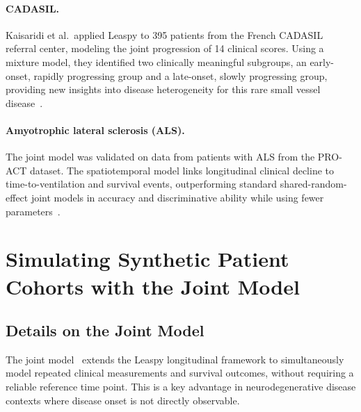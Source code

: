 \documentclass{rapportCS}
\begin{document}
\paragraph{CADASIL.}
Kaisaridi et al.\ applied Leaspy to 395 patients from the French CADASIL referral center, modeling the joint progression of 14 clinical scores. Using a mixture model, they identified two clinically meaningful subgroups, an early-onset, rapidly progressing group and a late-onset, slowly progressing group, providing new insights into disease heterogeneity for this rare small vessel disease~\cite{kaisaridi2025mixture}.
\vspace*{-0.2cm}
\paragraph{Amyotrophic lateral sclerosis (ALS).}
The joint model was validated on data from patients with ALS from the PRO-ACT dataset. The spatiotemporal model links longitudinal clinical decline to time-to-ventilation and survival events, outperforming standard shared-random-effect joint models in accuracy and discriminative ability while using fewer parameters~\cite{ortholand2025joint}. 

\newpage

\section{Simulating Synthetic Patient Cohorts with the Joint Model}

\subsection{Details on the Joint Model}

The joint model~\cite{ortholand2025joint} extends the Leaspy longitudinal framework to simultaneously model repeated clinical measurements and survival outcomes, without requiring a reliable reference time point. This is a key advantage in neurodegenerative disease contexts where disease onset is not directly observable.
\end{document}
